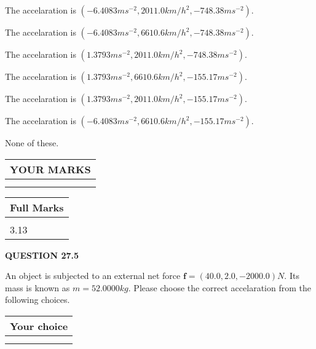 \documentclass[12pt]{article}
\begin{document}
  
 
 
The accelaration is
$(
-6.4083ms^{-2},
2011.0km/h^2,
-748.38ms^{-2}
).
$
 
 
The accelaration is
$(
-6.4083ms^{-2},
6610.6km/h^2,
-748.38ms^{-2}
).
$
 
 
The accelaration is
$(
1.3793ms^{-2},
2011.0km/h^2,
-748.38ms^{-2}
).
$
 
 
The accelaration is
$(
1.3793ms^{-2},
6610.6km/h^2,
-155.17ms^{-2}
).
$
 
 
The accelaration is
$(
1.3793ms^{-2},
2011.0km/h^2,
-155.17ms^{-2}
).
$
 
 
The accelaration is
$(
-6.4083ms^{-2},
6610.6km/h^2,
-155.17ms^{-2}
).
$
 
 
 None of these.
 
 
 
 

 
\vspace{0.3in}
  
\vspace{0.2in}
  
\noindent\begin{tabular}{|l|}
\hline
 YOUR MARKS  \\
\hline
 \\ 
 \\ 
\hline
\end{tabular}
\hspace{0.05in} \begin{tabular}{|l|}
\hline
 Full Marks  \\
\hline
 \\ 
3.13 \\
\hline
\end{tabular}
{\textbf{\Large{QUESTION
27.5 
}}}
  
  
 
 
An object is subjected to an external net force $\mathbf{f}=
(40.0 , 2.0 , -2000.0) N$.
Its mass is known as $m= %
52.0000 kg$. Please choose the
correct accelaration from the following choices.
 
  
  
\noindent\hspace{3.0in} \begin{tabular}{|l|}
\hline
Your choice \\
\hline
 \\ 
 \\ 
\hline
\end{tabular}
  
\end{document}
